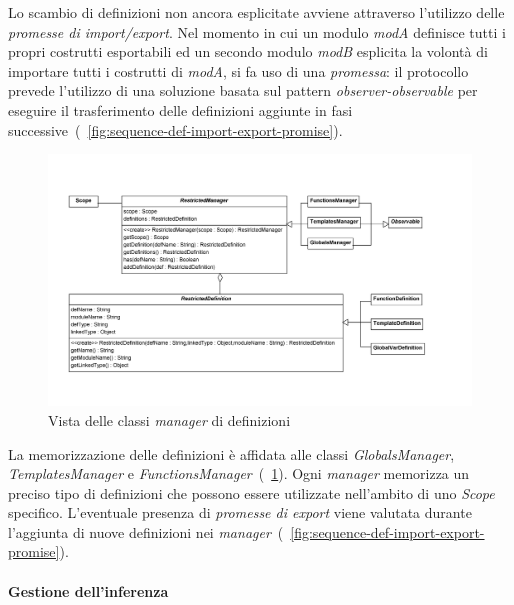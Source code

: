 Lo scambio di definizioni non ancora esplicitate avviene attraverso l'utilizzo delle \emph{promesse di import/export}. Nel momento in cui un modulo \emph{modA} definisce tutti i propri costrutti esportabili ed un secondo modulo \emph{modB} esplicita la volontà di importare tutti i costrutti di \emph{modA}, si fa uso di una \emph{promessa}: il protocollo prevede l'utilizzo di una soluzione basata sul pattern \emph{observer-observable} per eseguire il trasferimento delle definizioni aggiunte in fasi successive~(\figurename~\ref{fig:sequence-def-import-export-promise}).

\begin{figure}
\centering
\includegraphics[width=1\textwidth]{Immagini/Capitolo3/Classi/myclips_RestrictedManager.png}
\caption{Vista delle classi \emph{manager} di definizioni}\label{fig:class-myclips-restricted-manager}
\end{figure}

La memorizzazione delle definizioni è affidata alle classi \emph{GlobalsManager}, \emph{TemplatesManager} e \emph{FunctionsManager}~(\figurename~\ref{fig:class-myclips-restricted-manager}). 
Ogni \emph{manager} memorizza un preciso tipo di definizioni che possono essere utilizzate nell'ambito di uno \emph{Scope} specifico. L'eventuale presenza di \emph{promesse di export} viene valutata durante l'aggiunta di nuove definizioni nei \emph{manager}~(\figurename~\ref{fig:sequence-def-import-export-promise}).


\paragraph{Gestione dell'inferenza}

